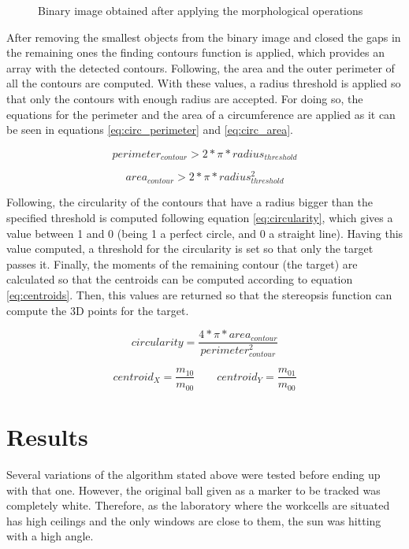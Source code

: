 \begin{figure}[h]
    \centering
    \caption{Binary image obtained after applying the morphological operations}
    \label{fig:filtered_image}
\end{figure}

After removing the smallest objects from the binary image and closed the gaps in the remaining ones the finding contours function is applied, which provides an array with the detected contours. Following, the area and the outer perimeter of all the contours are computed. With these values, a radius threshold is applied so that only the contours with enough radius are accepted. For doing so, the equations for the perimeter and the area of a circumference are applied as it can be seen in equations \ref{eq:circ_perimeter} and \ref{eq:circ_area}.

\begin{equation}
perimeter_{contour}>2*\pi*radius_{threshold}
\label{eq:circ_perimeter}
\end{equation}

\begin{equation}
area_{contour}>2*\pi*radius_{threshold}^{2}
\label{eq:circ_area}
\end{equation}

Following, the circularity of the contours that have a radius bigger than the specified threshold is computed following equation \ref{eq:circularity}, which gives a value between 1 and 0 (being 1 a perfect circle, and 0 a straight line). Having this value computed, a threshold for the circularity is set so that only the target passes it. Finally, the moments of the remaining contour (the target) are calculated so that the centroids can be computed according to equation \ref{eq:centroids}. Then, this values are returned so that the stereopsis function can compute the 3D points for the target.

\begin{equation}
circularity=\frac{4*\pi*area_{contour}}{perimeter_{contour}^{2}}
\label{eq:circularity}
\end{equation}

\begin{equation}
centroid_{X}=\frac{m_{10}}{m_{00}} \qquad centroid_{Y}=\frac{m_{01}}{m_{00}}
\label{eq:centroids}
\end{equation}

\section{Results}
Several variations of the algorithm stated above were tested before ending up with that one. However, the original ball given as a marker to be tracked was completely white. Therefore, as the laboratory where the workcells are situated has high ceilings and the only windows are close to them, the sun was hitting with a high angle. 


